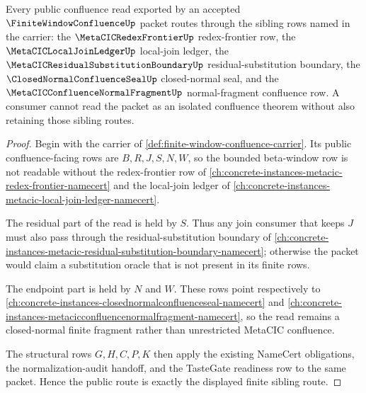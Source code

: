 \begin{theorem}
\label{thm:finite-window-confluence-sibling-route}
Every public confluence read exported by an accepted $\FiniteWindowConfluenceUp$ packet routes through the sibling rows named in the carrier: the $\MetaCICRedexFrontierUp$ redex-frontier row, the $\MetaCICLocalJoinLedgerUp$ local-join ledger, the $\MetaCICResidualSubstitutionBoundaryUp$ residual-substitution boundary, the $\ClosedNormalConfluenceSealUp$ closed-normal seal, and the $\MetaCICConfluenceNormalFragmentUp$ normal-fragment confluence row. A consumer cannot read the packet as an isolated confluence theorem without also retaining those sibling routes.
\end{theorem}
\begin{proof}
Begin with the carrier of \autoref{def:finite-window-confluence-carrier}. Its public confluence-facing rows are $B,R,J,S,N,W$, so the bounded beta-window row is not readable without the redex-frontier row of \autoref{ch:concrete-instances-metacic-redex-frontier-namecert} and the local-join ledger of \autoref{ch:concrete-instances-metacic-local-join-ledger-namecert}.

The residual part of the read is held by $S$. Thus any join consumer that keeps $J$ must also pass through the residual-substitution boundary of \autoref{ch:concrete-instances-metacic-residual-substitution-boundary-namecert}; otherwise the packet would claim a substitution oracle that is not present in its finite rows.

The endpoint part is held by $N$ and $W$. These rows point respectively to \autoref{ch:concrete-instances-closednormalconfluenceseal-namecert} and \autoref{ch:concrete-instances-metacicconfluencenormalfragment-namecert}, so the read remains a closed-normal finite fragment rather than unrestricted MetaCIC confluence.

The structural rows $G,H,C,P,K$ then apply the existing NameCert obligations, the normalization-audit handoff, and the TasteGate readiness row to the same packet. Hence the public route is exactly the displayed finite sibling route.
\end{proof}


